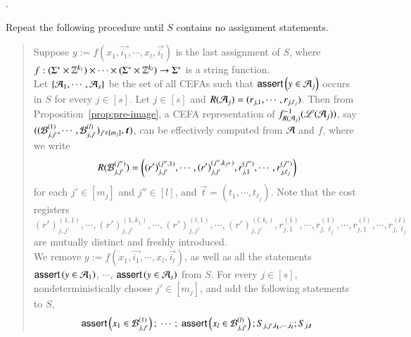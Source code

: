 \medskip
{}.

\smallskip

Repeat the following procedure until $S$ contains no assignment statements.
%
\begin{quote}
Suppose $y := f(x_1, \vec{i_1}, \cdots, x_l, \vec{i_l})$ is the last assignment of $S$, where $f: (\Sigma^* \times \mathbb{Z}^{k_1}) \times \cdots \times (\Sigma^* \times \mathbb{Z}^{k_l}) \rightarrow \Sigma^*$ is a string function. 
\\
Let $\{\mathcal{A}_1, \cdots, \mathcal{A}_s\}$ be the set of all CEFAs such that $\textsf{assert}\left(y \in \mathcal{A}_j\right)$ occurs in $S$ for every $j \in [s]$. 
Let $j \in [s]$ and $R(\mathcal{A}_j)=(r_{j,1}, \cdots, r_{j, \ell_j})$. Then from Proposition~\ref{prop:pre-image}, 
a CEFA representation of $f^{-1}_{R(\mathcal{A}_j)}(\mathscr{L}(\mathcal{A}_j))$, say $((\cB^{(1)}_{j, j'}, \cdots, \cB^{(l)}_{j, j'})_{j' \in [m_j]}, \vec{t})$, can be effectively computed from $\mathcal{A}$ and $f$, where we write
\[
R(\mathcal{B}^{(j'')}_{j, j'})=\left((r')^{(j'',1)}_{j, j'}, \cdots, (r')_{j, j'}^{(j'',k_{j''})}, r^{(j'')}_{j, 1}, \cdots,r^{(j'')}_{j, \ell_j} \right)
\]
for each $j' \in [m_j]$ and $j'' \in [l]$, and $\vec{t}=(t_1,\cdots, t_{\ell_j})$. Note that the cost registers $(r')^{(1,1)}_{j, j'}, \cdots, (r')_{j, j'}^{(1,k_1)}, \cdots, (r')^{(l,1)}_{j, j'}, \cdots, (r')_{j, j'}^{(l,k_l)}, r^{(1)}_{j, 1}, \cdots,r^{(1)}_{j, \ell_j}, \cdots, r^{(l)}_{j, 1}, \cdots,r^{(l)}_{j, \ell_j}$ are mutually distinct and freshly introduced.\\
%
We remove $y := f(x_1, \vec{i_1}, \cdots, x_l, \vec{i_l})$, as well as all the statements $\textsf{assert}\left(y \in \mathcal{A}_1\right)$, $\cdots$, $\textsf{assert}\left(y \in \mathcal{A}_s\right)$ from $S$. For every $j \in [s]$, nondeterministically choose $j' \in [m_j]$, and add the following statements to $S$, 
%
\[
\begin{array}{l}
\ASSERT{x_1 \in \cB^{(1)}_{j, j'}};\ \cdots;\ \ASSERT{x_l \in \cB^{(l)}_{j, j'}}; S_{j, j', \vec{i_1}, \cdots, \vec{i_l}}; S_{j, \vec{t}}\\
\end{array}
\]
\end{quote}
